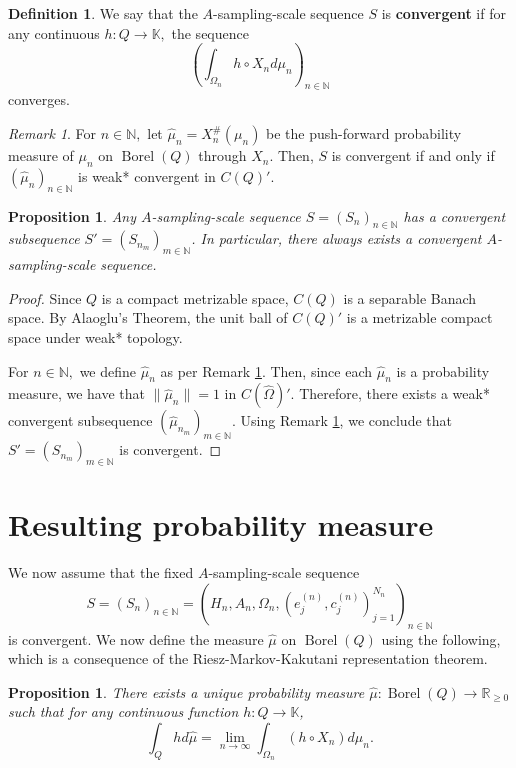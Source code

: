 \documentclass{amsart}
\newtheorem{prop}[thm]{Proposition}
\theoremstyle{definition}
\newtheorem{definition}[thm]{Definition}
\theoremstyle{remark}
\newtheorem{remark}[thm]{Remark}
\def \Borel{\operatorname{Borel}}
\def \HOM{\hat{\Omega}}
\def \HMU{\hat{\mu}}
\begin{document}
\begin{definition}
	We say that the $A$-sampling-scale sequence $S$ is \textbf{convergent} if for any continuous $h:Q\rightarrow\mathbb{K},$ the sequence $$\left(\int_{\Omega_n} h\circ X_n d\mu_n\right)_{n\in\mathbb{N}}$$ converges.
\end{definition}
\begin{remark}\label{remark_weak_star_equivalence}
	For $n\in\mathbb{N},$ let $\HMU_n=X_n^{\#}(\mu_n)$ be the push-forward probability measure of $\mu_n$ on $\Borel(Q)$ through $X_n$. Then, $S$ is convergent if and only if $(\HMU_n)_{n\in\mathbb{N}}$ is weak* convergent in $C(Q)'$.
\end{remark}
\begin{prop}
	Any $A$-sampling-scale sequence $S=(S_n)_{n\in\mathbb{N}}$ has a convergent subsequence $S'=(S_{n_m})_{m\in\mathbb{N}}$. In particular, there always exists a convergent $A$-sampling-scale sequence.
\end{prop}
\begin{proof}
	Since $Q$ is a compact metrizable space, $C(Q)$ is a separable Banach space. By Alaoglu's Theorem, the unit ball of $C(Q)'$ is a metrizable compact space under weak* topology. 
	
	For $n\in\mathbb{N},$ we define $\HMU_n$ as per Remark \ref{remark_weak_star_equivalence}. Then, since each $\HMU_n$ is a probability measure, we have that $\|\HMU_n\|=1$ in $C(\HOM)'$. Therefore, there exists a weak* convergent subsequence $(\HMU_{n_m})_{m\in\mathbb{N}}$. Using Remark \ref{remark_weak_star_equivalence}, we conclude that  $S'=(S_{n_m})_{m\in\mathbb{N}}$ is convergent.
\end{proof}
\section{Resulting probability measure}
We now assume that the fixed $A$-sampling-scale sequence $$S=(S_n)_{n\in\mathbb{N}}=(H_n,A_n,\Omega_n,(e_j^{(n)},c_j^{(n)})_{j=1}^{N_n})_{n\in\mathbb{N}}$$ is convergent. We now define the measure $\HMU$ on $\Borel(Q)$ using the following, which is a consequence of the Riesz-Markov-Kakutani representation theorem.

\begin{prop}\label{proposition_riesz_markov}
	There exists a unique probability measure $\HMU:\Borel(Q)\rightarrow\mathbb{R}_{\geq 0}$ such that for any continuous function $h:Q\rightarrow\mathbb{K}$, $$\int_{Q}h d\HMU=\lim_{n\rightarrow\infty}\int_{\Omega_n}(h\circ X_n)d\mu_n.$$
\end{prop}
\end{document}

